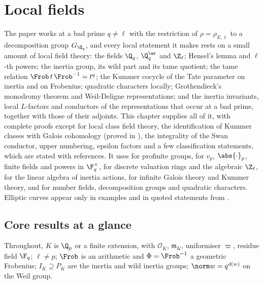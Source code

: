 \chapter{Local fields}\label{ch:local}

The paper works at a bad prime $q\ne\ell$ with the restriction of $\rho=\rho_{E,\ell}$ to a decomposition group $G_{\Q_q}$, and every local statement it makes
rests on a small amount of local field theory: the fields $\Q_q$, $\Q_q^{\ur}$ and $\Z_\ell$; Hensel's lemma and $\ell$-th powers; the inertia group, its wild
part and its tame quotient; the tame relation $\Frob\,t\,\Frob^{-1}=t^q$; the Kummer cocycle of the Tate parameter on inertia and on Frobenius; quadratic
characters locally; Grothendieck's monodromy theorem and Weil-Deligne representations; and the inertia invariants, local $L$-factors and conductors of the
representations that occur at a bad prime, together with those of their adjoints. This chapter supplies all of it, with complete proofs except for local class
field theory, the identification of Kummer classes with Galois cohomology (proved in ), the integrality of the Swan conductor, upper
numbering, epsilon factors and a few classification statements, which are stated with references. It uses
 for profinite groups,  for $v_p$, $\abs{\cdot}_p$, finite fields and powers in $\F_q^\times$,  for discrete valuation rings and
the algebraic $\Z_\ell$,  for the linear algebra of inertia actions,  for infinite Galois theory and Kummer theory, and
 for number fields, decomposition groups and quadratic characters. Elliptic curves appear only in examples and in quoted statements from
.

\section*{Core results at a glance}

Throughout, $K$ is $\Q_p$ or a finite extension, with $\mathcal O_K$, $\mathfrak m_K$, uniformiser $\varpi$, residue field $\F_q$; $\ell\ne p$; $\Frob$ is an arithmetic and
$\Phi=\Frob^{-1}$ a geometric Frobenius; $I_K\supseteq P_K$ are the inertia and wild inertia groups; $\norm w=q^{d(w)}$ on the Weil group.

